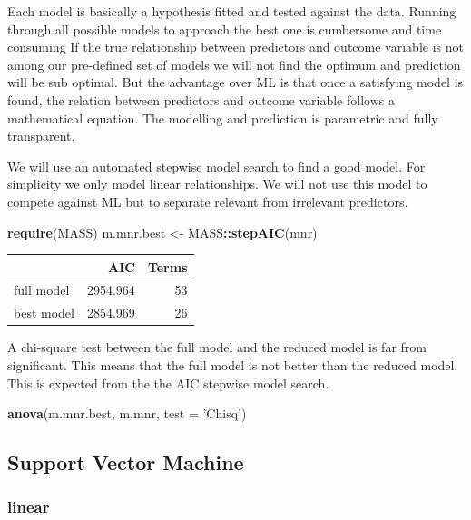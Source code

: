 \documentclass[]{article}
\newenvironment{Shaded}{\begin{snugshade}}{\end{snugshade}}
\newcommand{\DataTypeTok}[1]{\textcolor[rgb]{0.13,0.29,0.53}{#1}}
\newcommand{\KeywordTok}[1]{\textcolor[rgb]{0.13,0.29,0.53}{\textbf{#1}}}
\newcommand{\NormalTok}[1]{#1}
\newcommand{\OperatorTok}[1]{\textcolor[rgb]{0.81,0.36,0.00}{\textbf{#1}}}
\newcommand{\StringTok}[1]{\textcolor[rgb]{0.31,0.60,0.02}{#1}}
\begin{document}
Each model is basically a hypothesis fitted and tested against the data.
Running through all possible models to approach the best one is
cumbersome and time consuming If the true relationship between
predictors and outcome variable is not among our pre-defined set of
models we will not find the optimum and prediction will be sub optimal.
But the advantage over ML is that once a satisfying model is found, the
relation between predictors and outcome variable follows a mathematical
equation. The modelling and prediction is parametric and fully
transparent.

We will use an automated stepwise model search to find a good model. For
simplicity we only model linear relationships. We will not use this
model to compete against ML but to separate relevant from irrelevant
predictors.

\begin{Shaded}
\begin{Highlighting}[]
\KeywordTok{require}\NormalTok{(MASS)}
\NormalTok{m.mnr.best <-}\StringTok{ }\NormalTok{MASS}\OperatorTok{::}\KeywordTok{stepAIC}\NormalTok{(mnr)}
\end{Highlighting}
\end{Shaded}

\begin{longtable}[]{@{}lrr@{}}
\toprule
& AIC & Terms\tabularnewline
\midrule
\endhead
full model & 2954.964 & 53\tabularnewline
best model & 2854.969 & 26\tabularnewline
\bottomrule
\end{longtable}

A chi-square test between the full model and the reduced model is far
from significant. This means that the full model is not better than the
reduced model. This is expected from the the AIC stepwise model search.

\begin{Shaded}
\begin{Highlighting}[]
\KeywordTok{anova}\NormalTok{(m.mnr.best, m.mnr, }\DataTypeTok{test =} \StringTok{'Chisq'}\NormalTok{)}
\end{Highlighting}
\end{Shaded}

\hypertarget{support-vector-machine}{%
\subsection{Support Vector Machine}\label{support-vector-machine}}

\hypertarget{linear}{%
\subsubsection{linear}\label{linear}}
\end{document}
